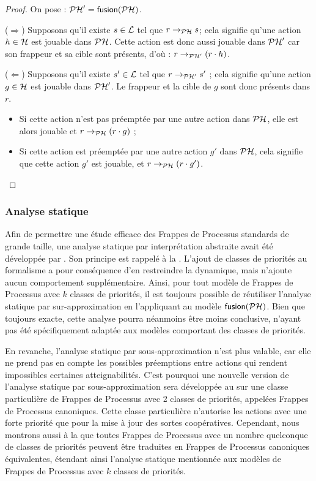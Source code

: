 \begin{proof}
  On pose : $\mathcal{PH}' = \mathsf{fusion}(\mathcal{PH})$.

  ($\Rightarrow$) Supposons qu'il existe $s \in \mathcal{L}$ tel que $r \rightarrow_{\mathcal{PH}} s$;
    cela signifie qu'une action $h \in \mathcal{H}$ est jouable dans $\mathcal{PH}$.
    Cette action est donc aussi jouable dans $\mathcal{PH}'$ car son frappeur et sa cible sont présents,
    d'où : $r \rightarrow_{\mathcal{PH}'} (r \cdot h)$.
    
  ($\Leftarrow$) Supposons qu'il existe $s' \in \mathcal{L}$ tel que $r \rightarrow_{\mathcal{PH}'} s'$ ;
    cela signifie qu'une action $g \in \mathcal{H}$ est jouable dans $\mathcal{PH}'$.
    Le frappeur et la cible de $g$ sont donc présents dans $r$.
    \begin{itemize}
      \item Si cette action n'est pas préemptée par une autre action dans $\mathcal{PH}$,
        elle est alors jouable et $r \rightarrow_{\mathcal{PH}} (r \cdot g)$ ;
      \item Si cette action est préemptée par une autre action $g'$ dans $\mathcal{PH}$,
        cela signifie que cette action $g'$ est jouable, et $r \rightarrow_{\mathcal{PH}} (r \cdot g')$.
        \qedhere
    \end{itemize}
\end{proof}

\subsubsection{Analyse statique}

Afin de permettre une étude efficace des Frappes de Processus standards de grande taille,
une analyse statique par interprétation abstraite avait été développée
par .
Son principe est rappelé à la .
L'ajout de classes de priorités au formalisme a pour conséquence d'en restreindre la dynamique,
mais n'ajoute aucun comportement supplémentaire.
Ainsi, pour tout modèle de Frappes de Processus avec $k$ classes de priorités,
il est toujours possible de réutiliser l'analyse statique par sur-approximation
en l'appliquant au modèle $\mathsf{fusion}(\mathcal{PH})$.
Bien que toujours exacte, cette analyse pourra néanmoins être moins conclusive,
n'ayant pas été spécifiquement adaptée aux modèles comportant des classes de priorités.

En revanche, l'analyse statique par sous-approximation n'est plus valable,
car elle ne prend pas en compte les possibles préemptions entre actions qui rendent
impossibles certaines atteignabilités.
C'est pourquoi une nouvelle version de l'analyse statique par sous-approximation sera développée
au 
sur une classe particulière de Frappes de Processus avec 2 classes de priorités, appelées
Frappes de Processus canoniques.
Cette classe particulière n'autorise les actions avec une forte priorité que pour la mise à jour
des sortes coopératives.
Cependant, nous montrons aussi à la 
que toutes Frappes de Processus avec un nombre quelconque de classes de priorités
peuvent être traduites en Frappes de Processus canoniques équivalentes,
étendant ainsi l'analyse statique mentionnée aux modèles de Frappes de Processus
avec $k$ classes de priorités.

